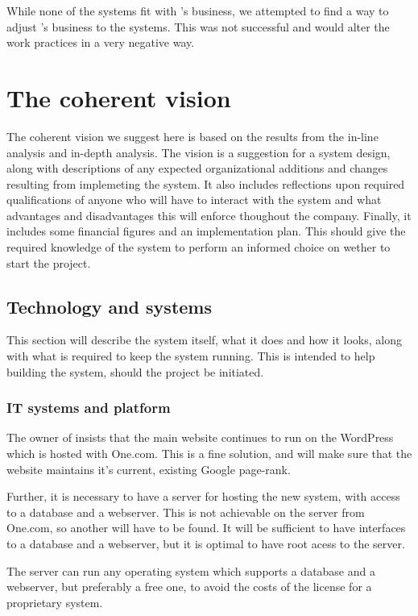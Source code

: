While none of the systems fit with \gomonkey{}'s business, we attempted
to find a way to adjust \gomonkey{}'s business to the systems. This was not 
successful and would alter the work practices in a very negative way.


\section{The coherent vision}
The coherent vision we suggest here is based on the results from the in-line 
analysis and in-depth analysis. The vision is a suggestion for a system design, 
along with descriptions of any expected organizational additions and changes 
resulting from implemeting the system. It also includes reflections upon 
required qualifications of anyone who will have to interact with the system
and what advantages and disadvantages this will enforce thoughout the company.
Finally, it includes some financial figures and an implementation plan. This 
should give the required knowledge of the system to perform an informed choice
on wether to start the project.

\subsection{Technology and systems}
This section will describe the system itself, what it does and how it looks,
along with what is required to keep the system running. This is intended to 
help building the system, should the project be initiated.

\subsubsection{IT systems and platform}
The owner of \gomonkey{} insists that the main website continues to run on the 
WordPress which is hosted with One.com. This is a fine solution, and will make
sure that the website maintains it's current, existing Google page-rank.

Further, it is necessary to have a server for hosting the new system, with 
access to a database and a webserver. This is not achievable on the server from 
One.com, so another will have to be found. It will be sufficient to have 
interfaces to a database and a webserver, but it is optimal to have root acess
to the server.

The server can run any operating system which supports a database and a 
webserver, but preferably a free one, to avoid the costs of the license for a 
proprietary system.

